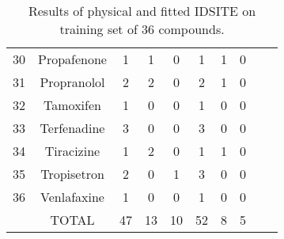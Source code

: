 \begin{table}[h]
\begin{tabular}{cccccccccc}
30	&Propafenone	&1	&1	&0	&1	&1	&0	&	&\\
31	&Propranolol	&2	&2	&0	&2	&1	&0	&	&\\
32	&Tamoxifen	&1	&0	&0	&1	&0	&0	&	&\\
33	&Terfenadine	&3	&0	&0	&3	&0	&0	&	&\\
34	&Tiracizine	&1	&2	&0	&1	&1	&0	&	&\\
35	&Tropisetron	&2	&0	&1	&3	&0	&0	&	&\\
36	&Venlafaxine	&1	&0	&0	&1	&0	&0	&	&\\
	&TOTAL	&47	&13	&10	&52	&8	&5	&	&\\
\hline
\end{tabular}
\caption{Results of physical and fitted IDSITE on training set of 36 compounds.}
\label{table:p450_testing}
\end{table}
